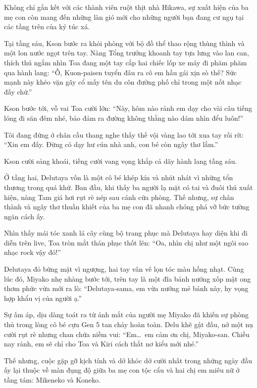 \documentclass[../main.tex]{subfiles}
\begin{document}
\ct

Không chỉ gắn kết với các thành viên ruột thịt nhà Hikawa, sự xuất hiện của ba mẹ con còn mang đến những làn gió mới cho những người bạn đang cư ngụ tại các tầng trên của ký túc xá.

Tại tầng sáu, Kson bước ra khỏi phòng với bộ đồ thể thao rộng thùng thình và một lon nước ngọt trên tay. Nàng Tổng trưởng khoanh tay tựa lưng vào lan can, thích thú ngắm nhìn Toa đang một tay cắp hai chiếc lốp xe máy đi phăm phăm qua hành lang: ``Ồ, Kuon-paisen tuyển đâu ra cô em hầu gái xịn sò thế? Sức mạnh này khéo vặn gãy cổ mấy tên du côn đường phố chỉ trong một nốt nhạc đấy chứ.''

Kson bước tới, vỗ vai Toa cười lớn: ``Này, hôm nào rảnh em dạy cho vài câu tiếng lóng đi săn đêm nhé, bảo đảm ra đường không thằng nào dám nhìn đểu luôn!''

Tôi đang đứng ở chân cầu thang nghe thấy thế vội vàng lao tới xua tay rối rít: ``Xin em đấy. Đừng có dạy hư cún nhà anh, con bé còn ngây thơ lắm.''

Kson cười sảng khoái, tiếng cười vang vọng khắp cả dãy hành lang tầng sáu.

Ở tầng hai, Delutaya vốn là một cô bé khép kín và nhút nhát vì những tổn thương trong quá khứ. Ban đầu, khi thấy ba người lạ mặt có tai và đuôi thú xuất hiện, nàng Tam giá hơi rụt rè nép sau cánh cửa phòng. Thế nhưng, sự chân thành và ngây thơ thuần khiết của ba mẹ con đã nhanh chóng phá vỡ bức tường ngăn cách ấy.

Nhìn thấy mái tóc xanh lá cây cùng bộ trang phục mà Delutaya hay diện khi đi diễn trên live, Toa tròn mắt thán phục thốt lên: ``Oa, nhìn chị như một ngôi sao nhạc rock vậy đó!''

Delutaya đỏ bừng mặt vì ngượng, hai tay vân vê lọn tóc màu hồng nhạt. Cùng lúc đó, Miyako nhẹ nhàng bước tới, trên tay là một đĩa bánh nướng xốp mật ong thơm phức vừa mới ra lò: ``Delutaya-sama, em vừa nướng mẻ bánh này, hy vọng hợp khẩu vị của người ạ.''

Sự ấm áp, dịu dàng toát ra từ ánh mắt của người mẹ Miyako đã khiến sự phòng thủ trong lòng cô bé cựu Gen 5 tan chảy hoàn toàn. Delu khẽ gật đầu, nở một nụ cười rụt rè nhưng chan chứa niềm vui: ``Em\dots\ em cảm ơn chị, Miyako-san. Chiều nay rảnh, em sẽ chỉ cho Toa và Kiri cách thắt nơ kiểu mới nhé.''

Thế nhưng, cuộc gặp gỡ kịch tính và dở khóc dở cười nhất trong những ngày đầu ấy lại thuộc về màn đụng độ giữa ba mẹ con tộc cẩu và hai chị em miêu nữ ở tầng tám: Mikeneko và Koneko.
\end{document}

